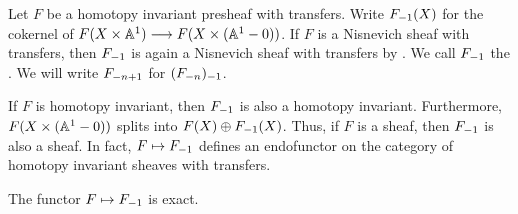 \begin{defn}\label{def_contract}
Let $F$ be a homotopy invariant presheaf with transfers. Write
$\RHI{F}(X)$ for the cokernel of $F(X \times \A^1) \to F(X \times 
(\A^1 - 0))$. If $F$ is a Nisnevich sheaf with transfers, then 
$\RHI{F}$ is again a Nisnevich sheaf with transfers by 
\cite[23.5]{MVW}. We call $\RHI{F}$ the . We will write $\RHI[n + 1]{F}$ for $\RHI{(\RHI[n]{F})}$.
\end{defn}

If $F$ is homotopy invariant, then $\RHI{F}$ is also a homotopy 
invariant. Furthermore, $F(X \times (\A^1 - 0))$ splits into 
$F(X) \oplus \RHI{F}(X)$. Thus, if $F$ is a sheaf, then $\RHI{F}$ 
is also a sheaf. In fact, $F \mapsto \RHI{F}$ defines an
endofunctor on the category of homotopy invariant sheaves with 
transfers.

\begin{prop}
\label{prop_contract_is_exact}
The functor $F \mapsto \RHI{F}$ is exact.
\end{prop}
